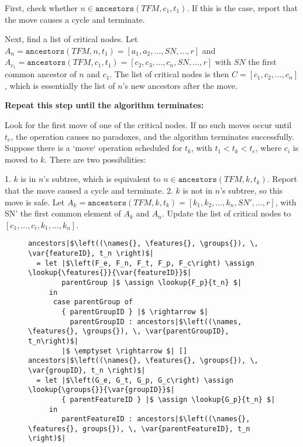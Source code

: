 First, check whether $n \in \texttt{ancestors}(TFM, c_1, t_1)$. If this is the case, report that the move causes a cycle and terminate. 

Next, find a list of critical nodes. 
Let $A_n = \texttt{ancestors}(TFM, n, t_1) = [a_1, a_2, \dots, SN, \dots, r]$ and $A_{c_1} = \texttt{ancestors}(TFM, c_1, t_1) = [c_2, c_3, \dots, c_n, SN, \dots, r]$ with $SN$ the first common ancestor of $n$ and $c_1$. The list of critical nodes is then $C = [c_1, c_2, \dots, c_n]$, which is essentially the list of $n$'s new ancestors after the move. 

\textbf{Repeat this step until the algorithm terminates:}

Look for the first move of one of the critical nodes. If no such moves occur until $t_e$, the operation causes no paradoxes, and the algorithm terminates successfully.  
  Suppose there is a `move` operation scheduled for $t_k$, with $t_1 < t_k < t_e$, where $c_i$ is moved to $k$. There are two possibilities:  

  1. $k$ is in $n$'s subtree, which is equivalent to $n \in \texttt{ancestors}(TFM, k, t_k)$. Report that the move caused a cycle and terminate. 
  2. $k$ is not in $n$'s subtree, so this move is safe. Let $A_k = \texttt{ancestors}(TFM, k, t_k) = [k_1, k_2, \dots, k_n, SN', \dots, r]$, with SN' the first common element of $A_k$ and $A_n$. Update the list of critical nodes to $[c_1, \dots, c_i, k_1, \dots, k_n]$.

\begin{figure}[h]
  \begin{verbatim}
ancestors|$\left((\names{}, \features{}, \groups{}), \, \var{featureID}, t_n \right)$| 
  = let |$\left(F_e, F_n, F_t, F_p, F_c\right) \assign     \lookup{\features{}}{\var{featureID}}$|
        parentGroup |$ \assign \lookup{F_p}{t_n} $|
     in 
      case parentGroup of
        { parentGroupID } |$ \rightarrow $| 
          parentGroupID : ancestors|$\left((\names, \features{}, \groups{}), \, \var{parentGroupID}, t_n\right)$|
        |$ \emptyset \rightarrow $| []
ancestors|$\left((\names{}, \features{}, \groups{}), \, \var{groupID}, t_n \right)$| 
  = let |$\left(G_e, G_t, G_p, G_c\right) \assign     \lookup{\groups{}}{\var{groupID}}$|
        { parentFeatureID } |$ \assign \lookup{G_p}{t_n} $|
     in 
        parentFeatureID : ancestors|$\left((\names{}, \features{}, groups{}), \, \var{parentFeatureID}, t_n \right)$| 
  \end{verbatim}
  \caption{\label{fun:ancestors}}
\end{figure}

